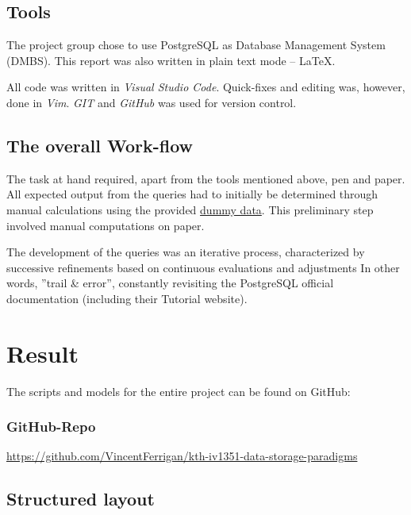 \documentclass[a4paper]{scrartcl}
\begin{document}
\subsection*{Tools}
The project group chose to use PostgreSQL as Database Management System (DMBS).
This report was also written in plain text mode -- \LaTeX.

All code was written in \emph{Visual Studio Code}.
Quick-fixes and editing was, however, done in \emph{Vim}. 
\emph{GIT} and \emph{GitHub} was used for version control.

\subsection*{The overall Work-flow}
The task at hand required, apart from the tools mentioned above,
pen and paper.
All expected output from the queries had to
initially be determined through manual calculations using the provided
\href{https://github.com/VincentFerrigan/kth-iv1351-data-storage-paradigms/blob/main/src/data/populate_tables.sql}{dummy data}.
This preliminary step involved manual computations on paper.

The development of the queries was an iterative process,
characterized by successive refinements based on continuous evaluations and adjustments
In other words, ''trail \& error'', constantly revisiting the
PostgreSQL official documentation (including their Tutorial website).

\pagebreak
\section{Result}
\label{sec:result}
The scripts and models for the entire project can be found on GitHub:

\subsubsection*{GitHub-Repo}
\url{https://github.com/VincentFerrigan/kth-iv1351-data-storage-paradigms}

\subsection*{Structured layout}
\label{subsec:struturedlayout}
\end{document}
